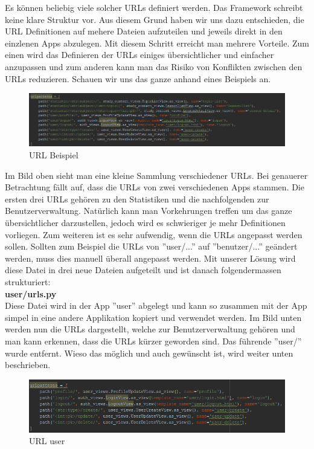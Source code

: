 \noindent Es können beliebig viele solcher URLs definiert werden. Das Framework schreibt keine klare Struktur vor. Aus diesem Grund haben wir uns dazu entschieden, die URL Definitionen auf mehere Dateien aufzuteilen und jeweils direkt in den einzlenen Apps abzulegen. Mit diesem Schritt erreicht man mehrere Vorteile. Zum einen wird das Definieren der URLs einiges übersichtlicher und einfacher anzupassen und zum anderen kann man das Risiko von Konflikten zwischen den URLs reduzieren. Schauen wir uns das ganze anhand eines Beispiels an. \\
\begin{minipage}{\textwidth}
	\begin{figure}[H]
		\includegraphics[width=\textwidth, height=\textheight, keepaspectratio]{images/URLschlecht.png}
		\caption{URL Beispiel}
	\end{figure}
\end{minipage}

\noindent Im Bild oben sieht man eine kleine Sammlung verschiedener URLs. Bei genauerer Betrachtung fällt auf, dass die URLs von zwei verschiedenen Apps stammen. Die ersten drei URLs gehören zu den Statistiken und die nachfolgenden zur Benutzerverwaltung. Natürlich kann man Vorkehrungen treffen um das ganze übersichtlicher darzustellen, jedoch wird es schwieriger je mehr Definitionen vorliegen. Zum weiteren ist es sehr aufwendig, wenn die URLs angepasst werden sollen. Sollten zum Beispiel die URLs von ''user/...'' auf ''benutzer/...'' geändert werden, muss dies manuell überall angepasst werden. 
Mit unserer Lösung wird diese Datei in drei neue Dateien aufgeteilt und ist danach folgendermassen strukturiert: \\

\noindent \textbf{user/urls.py} \\
Diese Datei wird in der App ''user'' abgelegt und kann so zusammen mit der App simpel in eine andere Applikation kopiert und verwendet werden. Im Bild unten werden nun die URLs dargestellt, welche zur Benutzerverwaltung gehören und man kann erkennen, dass die URLs kürzer geworden sind. Das führende ''user/'' wurde entfernt. Wieso das möglich und auch gewünscht ist, wird weiter unten beschrieben. \\
\begin{minipage}{\textwidth}
	\begin{figure}[H]
		\includegraphics[width=\textwidth, height=\textheight, keepaspectratio]{images/URLuser.png}
		\caption{URL user}
	\end{figure}
\end{minipage}


